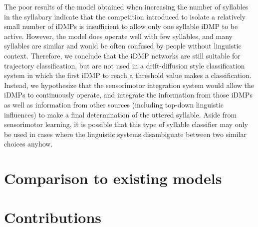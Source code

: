 The poor results of the model
obtained when increasing the number
of syllables in the syllabary
indicate that the competition
introduced to isolate a relatively small
number of iDMPs is insufficient
to allow only one syllable iDMP to be active.
However, the model does operate well
with few syllables,
and many syllables are similar
and would be often confused by people
without linguistic context.
Therefore, we conclude that
the iDMP networks are still suitable
for trajectory classification,
but are not used in a
drift-diffusion style classification system
in which the first iDMP to reach
a threshold value makes a classification.
Instead, we hypothesize that
the sensorimotor integration system
would allow the iDMPs to continuously operate,
and integrate the information from those iDMPs
as well as information from other sources
(including top-down linguistic influences)
to make a final determination
of the uttered syllable.
Aside from sensorimotor learning,
it is possible that
this type of syllable classifier
may only be used in cases where
the linguistic systems
disambiguate between two similar choices anyhow.









\section{Comparison to existing models}

\section{Contributions}

